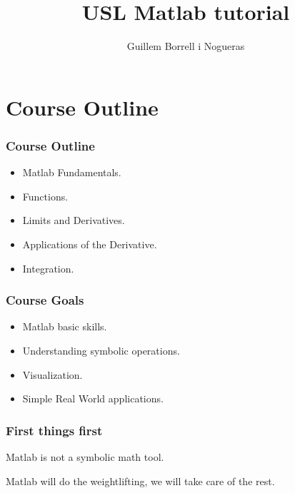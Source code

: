 \documentclass[12pt]{beamer}
\title{USL Matlab tutorial}
\author{Guillem Borrell i Nogueras}
\begin{document}

\begin{frame}
  \titlepage
\end{frame}

\begin{frame}
  \tableofcontents[pausesections]
\end{frame}


\section{Course Outline}

\begin{frame}
\frametitle{Course Outline}
\begin{itemize}
\item Matlab Fundamentals.
\item Functions.
\item Limits and Derivatives.
\item Applications of the Derivative.
\item Integration.
\end{itemize}
\end{frame}

\begin{frame}
  \frametitle{Course Goals}
  \begin{itemize}
  \item Matlab basic skills.
  \item Understanding symbolic operations.
  \item Visualization.
  \item Simple Real World applications.
  \end{itemize}
\end{frame}

\begin{frame}
  \frametitle{First things first}
  \begin{Huge}
    \begin{center}
      Matlab is not a symbolic math tool.
    \end{center}
  \end{Huge}
  Matlab will do the weightlifting, we will take care of the rest.
\end{frame}
\end{document}
